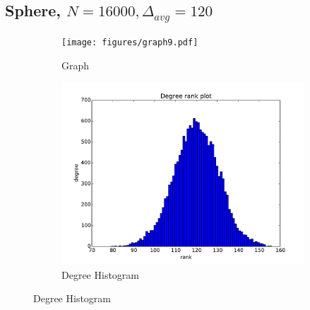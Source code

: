 \documentclass[oneside, titlepage]{scrartcl}
\begin{document}
\subsection{Sphere, $N=16000, \Delta_{avg}=120$}
\begin{figure}[!h]
\centering
\begin{subfigure}{0.5\textwidth}
	\centering
	\texttt{[image: figures/graph9.pdf]}
	\caption{Graph}
\end{subfigure}%
\begin{subfigure}{0.5\textwidth}
	\centering
	\includegraphics[width=0.9\linewidth]{figures/degrees9.pdf}
	\caption{Degree Histogram}
\end{subfigure}


\end{figure}
\end{document}
